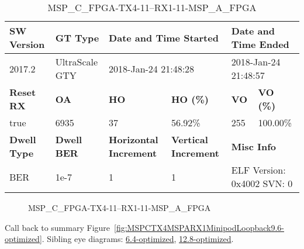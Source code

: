 \begin{table}[h]
\centering
\caption{MSP\_C\_FPGA-TX4-11--RX1-11-MSP\_A\_FPGA}
\label{tab:MSPCFPGATX411RX111MSPAFPGA9.6-optimized}
\begin{tabular}{@{}|l|l|l|l|l|l|@{}}
\toprule
\textbf{SW Version}                & \textbf{GT Type}   & \multicolumn{2}{l|}{\textbf{Date and Time Started}}            & \multicolumn{2}{l|}{\textbf{Date and Time Ended}}        \\ \midrule
2017.2                       & UltraScale GTY          & \multicolumn{2}{l|}{2018-Jan-24 21:48:28}                   & \multicolumn{2}{l|}{2018-Jan-24 21:48:57}               \\ \midrule
\textbf{Reset RX}                  & \textbf{OA} & \textbf{HO}   & \textbf{HO (\%)} & \textbf{VO} & \textbf{VO (\%)} \\ \midrule
true & 6935        & 37          & 56.92\%        & 255        & 100.00\%       \\ \midrule
\textbf{Dwell Type}                & \textbf{Dwell BER} & \textbf{Horizontal Increment} & \textbf{Vertical Increment}    & \multicolumn{2}{l|}{\textbf{Misc Info}}                  \\ \midrule
BER                            & 1e-7        & 1        & 1           & \multicolumn{2}{l|}{ELF Version: 0x4002 SVN: 0}                         \\ \bottomrule
\end{tabular}
\end{table}

\begin{figure}[h]
\caption{MSP\_C\_FPGA-TX4-11--RX1-11-MSP\_A\_FPGA} \label{fig:MSPCFPGATX411RX111MSPAFPGA9.6-optimized}
\end{figure}

Call back to summary Figure~\ref{fig:MSPCTX4MSPARX1MinipodLoopback9.6-optimized}.
Sibling eye diagrams: \hyperref[sec:MSPCFPGATX411RX111MSPAFPGA6.4-optimized]{6.4-optimized}, \hyperref[sec:MSPCFPGATX411RX111MSPAFPGA12.8-optimized]{12.8-optimized}.

\clearpage
\newpage

